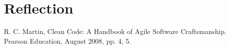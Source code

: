 \documentclass[conference]{IEEEtran}
\begin{document}
%
\section{Reflection}

%
\begin{thebibliography}{00}
 R. C. Martin, Clean Code: A Handbook of Agile Software Craftsmanship. Pearson Education, August 2008, pp. 4, 5.
\end{thebibliography}
\end{document}
